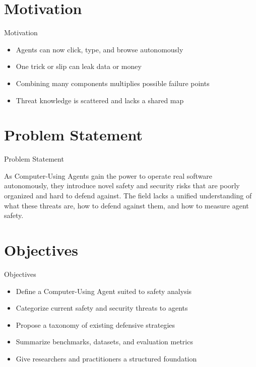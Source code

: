 \documentclass[10pt]{beamer}
\begin{document}
\section{Motivation}
\begin{frame}{Motivation}
\begin{itemize}
  \item Agents can now click, type, and browse autonomously
  \item One trick or slip can leak data or money
  \item Combining many components multiplies possible failure points
  \item Threat knowledge is scattered and lacks a shared map
\end{itemize}
\end{frame}

\section{Problem Statement}
\begin{frame}{Problem Statement}
  \begin{block}{}
  As Computer-Using Agents gain the power to operate real software autonomously, they introduce novel safety and security risks that are poorly organized and hard to defend against. The field lacks a unified understanding of what these threats are, how to defend against them, and how to measure agent safety.
  \end{block}
\end{frame}

\section{Objectives}
\begin{frame}{Objectives}
\begin{itemize}
  \item Define a Computer-Using Agent suited to safety analysis
  \item Categorize current safety and security threats to agents
  \item Propose a taxonomy of existing defensive strategies
  \item Summarize benchmarks, datasets, and evaluation metrics
  \item Give researchers and practitioners a structured foundation
\end{itemize}
\end{frame}
\end{document}
